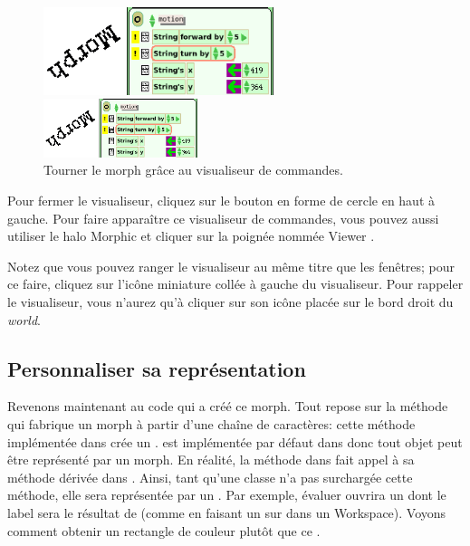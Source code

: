 \documentclass[a4paper,10pt,twoside]{book}
\begin{document}
\begin{figure}[ht]
	\ifluluelse
		{\centerline{\includegraphics[width=0.6\textwidth]{turningInViewer}}}
		{\centerline{\includegraphics[width=0.4\textwidth]{turningInViewer}}}
	\caption{Tourner le morph grâce au visualiseur de commandes.\label{fig:turningInViewer}}
\end{figure}

Pour fermer le visualiseur, cliquez sur le bouton en forme de cercle
en haut à gauche. Pour faire apparaître ce visualiseur de
commandes, vous pouvez aussi utiliser le halo Morphic et cliquer sur
la poignée nommée Viewer \viewerHandle{}.
   
Notez que vous pouvez ranger le visualiseur au même titre que les
fenêtres; pour ce faire, cliquez sur l'icône miniature collée à
gauche du visualiseur. Pour rappeler le visualiseur, vous n'aurez
qu'à cliquer sur son icône placée sur le bord droit du \emph{world}.

\subsection{Personnaliser sa représentation}

Revenons maintenant au code qui a créé ce morph.%
Tout repose sur la méthode qui fabrique un morph à partir d'une
chaîne de caractères:
cette méthode  implémentée dans
 crée un .  est
implémentée par défaut dans  donc tout objet peut
être représenté par un morph. En réalité, la méthode
 dans  fait appel à sa méthode dérivée
dans . Ainsi, tant qu'une classe n'a pas surchargée cette
méthode, elle sera représentée par un .
Par exemple, évaluer  ouvrira un
 dont le label sera le résultat de 
 (comme en faisant un  sur 
dans un Workspace).
Voyons comment obtenir un rectangle de couleur plutôt que ce
.
\end{document}
